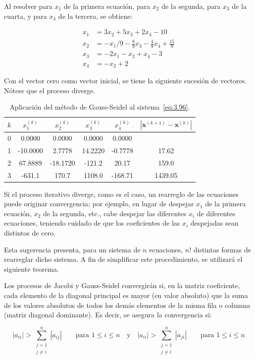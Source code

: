 \documentclass[12pt,letterpaper]{article}
\theoremstyle{definition}
\theoremstyle{plain}
\theoremstyle{remark}
\begin{document}
Al resolver para $x_1$ de la primera ecuación, para $x_2$ de la segunda, para $x_3$ de la cuarta, y para $x_4$ de la tercera, se obtiene:

\[
\begin{aligned}
x_1 &= 3x_2 + 5x_3 + 2x_4 - 10 \\
x_2 &= -x_1 / 9 - \frac{8}{9}x_3 - \frac{4}{9}x_4 + \frac{15}{9} \\
x_3 &= -2x_1 - x_2 + x_4 - 3 \\
x_4 &= -x_2 + 2
\end{aligned}
\]

Con el vector cero como vector inicial, se tiene la siguiente sucesión de vectores. Nótese que el proceso diverge.

\begin{table}[h!]
\centering
\caption{Aplicación del método de Gauss-Seidel al sistema~\eqref{eq:3.96}.}
\label{tab:3.3}
\begin{tabular}{c|c c c c|c}
$k$ & $x_1^{(k)}$ & $x_2^{(k)}$ & $x_3^{(k)}$ & $x_4^{(k)}$ & $|\mathbf{x}^{(k+1)} - \mathbf{x}^{(k)}|$ \\
\hline
0 & 0.0000 & 0.0000 & 0.0000 & 0.0000 & \\
1 & -10.0000 & 2.7778 & 14.2220 & -0.7778 & 17.62 \\
2 & 67.8889 & -18.1720 & -121.2 & 20.17 & 159.0 \\
3 & -631.1 & 170.7 & 1108.0 & -168.71 & 1439.05
\end{tabular}
\end{table}

Si el proceso iterativo diverge, como es el caso, un rearreglo de las ecuaciones puede originar convergencia; por ejemplo, en lugar de despejar $x_1$ de la primera ecuación, $x_2$ de la segunda, etc., cabe despejar las diferentes $x_i$ de diferentes ecuaciones, teniendo cuidado de que los coeficientes de las $x_i$ despejadas sean distintos de cero.

Esta sugerencia presenta, para un sistema de $n$ ecuaciones, $n!$ distintas formas de rearreglar dicho sistema. A fin de simplificar este procedimiento, se utilizará el siguiente teorema.

\begin{tcolorbox}[title=Teorema 1. Convergencia de Método Iterativo,colframe=cyan!70!black,colback=cyan!5!white]
Los procesos de Jacobi y Gauss-Seidel convergirán si, en la matriz coeficiente, cada elemento de la diagonal principal es mayor (en valor absoluto) que la suma de los valores absolutos de todos los demás elementos de la misma fila o columna (matriz diagonal dominante). Es decir, se asegura la convergencia si:

\[
|a_{ii}| > \sum_{\substack{j=1 \\ j \ne i}}^{n} |a_{ij}| \qquad \text{para } 1 \leq i \leq n
\quad \text{y} \quad
|a_{ii}| > \sum_{\substack{j=1 \\ j \ne i}}^{n} |a_{ji}| \qquad \text{para } 1 \leq i \leq n
\tag{17}
\label{eq:3.97}
\]
\end{tcolorbox}
\end{document}
